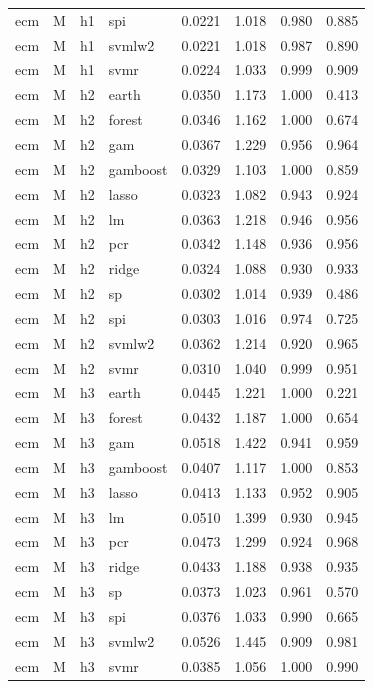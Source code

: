 \begin{ThreePartTable}
\begin{longtable}[t]{llclcccc}
ecm & M & h1 & spi & 0.0221 & 1.018 & 0.980 & 0.885\\
ecm & M & h1 & svmlw2 & 0.0221 & 1.018 & 0.987 & 0.890\\
ecm & M & h1 & svmr & 0.0224 & 1.033 & 0.999 & 0.909\\
\addlinespace
ecm & M & h2 & earth & 0.0350 & 1.173 & 1.000 & 0.413\\
ecm & M & h2 & forest & 0.0346 & 1.162 & 1.000 & 0.674\\
ecm & M & h2 & gam & 0.0367 & 1.229 & 0.956 & 0.964\\
ecm & M & h2 & gamboost & 0.0329 & 1.103 & 1.000 & 0.859\\
ecm & M & h2 & lasso & 0.0323 & 1.082 & 0.943 & 0.924\\
ecm & M & h2 & lm & 0.0363 & 1.218 & 0.946 & 0.956\\
ecm & M & h2 & pcr & 0.0342 & 1.148 & 0.936 & 0.956\\
ecm & M & h2 & ridge & 0.0324 & 1.088 & 0.930 & 0.933\\
ecm & M & h2 & sp & 0.0302 & 1.014 & 0.939 & 0.486\\
ecm & M & h2 & spi & 0.0303 & 1.016 & 0.974 & 0.725\\
ecm & M & h2 & svmlw2 & 0.0362 & 1.214 & 0.920 & 0.965\\
ecm & M & h2 & svmr & 0.0310 & 1.040 & 0.999 & 0.951\\
\addlinespace
ecm & M & h3 & earth & 0.0445 & 1.221 & 1.000 & 0.221\\
ecm & M & h3 & forest & 0.0432 & 1.187 & 1.000 & 0.654\\
ecm & M & h3 & gam & 0.0518 & 1.422 & 0.941 & 0.959\\
ecm & M & h3 & gamboost & 0.0407 & 1.117 & 1.000 & 0.853\\
ecm & M & h3 & lasso & 0.0413 & 1.133 & 0.952 & 0.905\\
ecm & M & h3 & lm & 0.0510 & 1.399 & 0.930 & 0.945\\
ecm & M & h3 & pcr & 0.0473 & 1.299 & 0.924 & 0.968\\
ecm & M & h3 & ridge & 0.0433 & 1.188 & 0.938 & 0.935\\
ecm & M & h3 & sp & 0.0373 & 1.023 & 0.961 & 0.570\\
ecm & M & h3 & spi & 0.0376 & 1.033 & 0.990 & 0.665\\
ecm & M & h3 & svmlw2 & 0.0526 & 1.445 & 0.909 & 0.981\\
ecm & M & h3 & svmr & 0.0385 & 1.056 & 1.000 & 0.990\\

\end{longtable}
\end{ThreePartTable}
